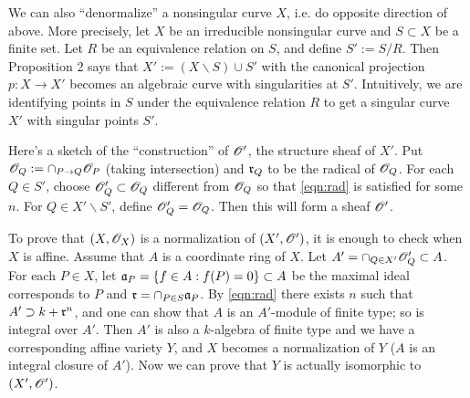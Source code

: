 \documentclass[letterpaper, 12pt]{article}
\begin{document}
We can also ``denormalize'' a nonsingular curve $X$, i.e. do opposite direction of above.
More precisely, let $X$ be an irreducible nonsingular curve and $S \subset X$ be a finite set.
Let $R$ be an equivalence relation on $S$, and define $S' := S / R$.
Then Proposition 2 says that $X' := (X \backslash S) \cup S'$ with the canonical projection $p:X \to X'$ becomes an algebraic curve with singularities at $S'$.
Intuitively, we are identifying points in $S$ under the equivalence relation $R$ to get a singular curve $X'$ with singular points $S'$.

Here's a sketch of the ``construction'' of $\mathscr{O}'$, the structure sheaf of $X'$.
Put $\mathscr{O}_Q := \cap_{P \to Q} \mathscr{O}_P$ (taking intersection) and $\mathfrak{r}_Q$ to be the radical of $\mathscr{O}_Q$.
For each $Q \in S'$, choose $\mathscr{O}_Q' \subset \mathscr{O}_Q$ different from $\mathscr{O}_Q$ so that \eqref{eqn:rad} is satisfied for some $n$.
For $Q \in X' \backslash S'$, define $\mathscr{O}_Q' = \mathscr{O}_Q$.
Then this will form a sheaf $\mathscr{O}'$.

To prove that $(X, \mathscr{O}_X)$ is a normalization of $(X', \mathscr{O}')$, it is enough to check when $X$ is affine.
Assume that $A$ is a coordinate ring of $X$.
Let $A' = \cap_{Q \in X'} \mathscr{O}_Q' \subset A$.
For each $P \in X$, let $\mathfrak{a}_P = \{f \in A: f(P) = 0\} \subset A$ be the maximal ideal corresponds to $P$ and $\mathfrak{r} = \cap_{P \in S} \mathfrak{a}_P$.
By \eqref{eqn:rad} there exists $n$ such that $A' \supset k + \mathfrak{r}^n$, and one can show that $A$ is an $A'$-module of finite type; so is integral over $A'$.
Then $A'$ is also a $k$-algebra of finite type and we have a corresponding affine variety $Y$, and $X$ becomes a normalization of $Y$ ($A$ is an integral closure of $A'$).
Now we can prove that $Y$ is actually isomorphic to $(X', \mathscr{O}')$.

\end{document}
